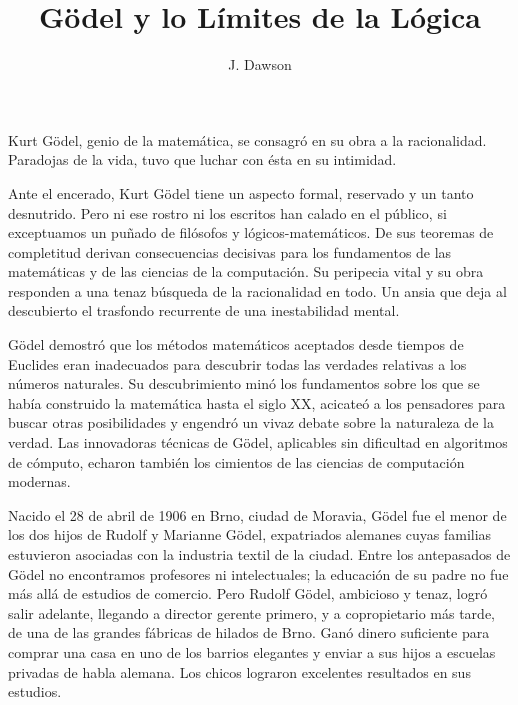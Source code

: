 \documentclass[a4paper, 12pt]{article}
\title{Gödel y lo Límites de la Lógica}
\author{J. Dawson}
\date{}
\begin{document}
\begin{tcolorbox}[colback=blue!5!white,colframe=blue!75!black]

\vspace{-1.8cm}
\textbf \maketitle

\end{tcolorbox}

\bigskip





Kurt Gödel, genio de la matemática, se consagró en su obra a la racionalidad. Paradojas de la vida, tuvo que luchar con ésta en su intimidad.

Ante el encerado, Kurt Gödel tiene un aspecto formal, reservado y un tanto desnutrido. Pero ni ese rostro ni los escritos han calado en el público, si exceptuamos un puñado de filósofos y lógicos-matemáticos. De sus teoremas de completitud derivan consecuencias decisivas para los fundamentos de las matemáticas y de las ciencias de la computación. Su peripecia vital y su obra responden a una tenaz búsqueda de la racionalidad en todo. Un ansia que deja al descubierto el trasfondo recurrente de una inestabilidad mental.

Gödel demostró que los métodos matemáticos aceptados desde tiempos de Euclides eran inadecuados para descubrir todas las verdades relativas a los números naturales. Su descubrimiento minó los fundamentos sobre los que se había construido la matemática hasta el siglo XX, acicateó a los pensadores para buscar otras posibilidades y engendró un vivaz debate sobre la naturaleza de la verdad. Las innovadoras técnicas de Gödel, aplicables sin dificultad en algoritmos de cómputo, echaron también los cimientos de las ciencias de computación modernas.

Nacido el 28 de abril de 1906 en Brno, ciudad de Moravia, Gödel fue el menor de los dos hijos de Rudolf y Marianne Gödel, expatriados alemanes cuyas familias estuvieron asociadas con la industria textil de la ciudad. Entre los antepasados de Gödel no encontramos profesores ni intelectuales; la educación de su padre no fue más allá de estudios de comercio. Pero Rudolf Gödel, ambicioso y tenaz, logró salir adelante, llegando a director gerente primero, y a copropietario más tarde, de una de las grandes fábricas de hilados de Brno. Ganó dinero suficiente para comprar una casa en uno de los barrios elegantes y enviar a sus hijos a escuelas privadas de habla alemana. Los chicos lograron excelentes resultados en sus estudios.
\end{document}
